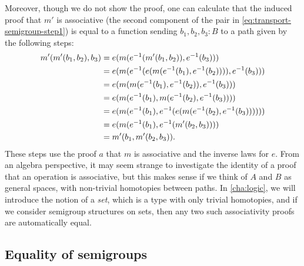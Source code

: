 Moreover, though we do not show the proof, one can calculate that the
induced proof that $m'$ is associative (the second component of the pair
in \eqref{eq:transport-semigroup-step1}) is equal to a function sending
$b_1,b_2,b_3 : B$ to a path given by the following steps:
\begin{equation}
  \label{eq:transport-semigroup-assoc}
  \begin{aligned}
    m'(m'(b_1,b_2),b_3)
    &= e(m(\opp{e}(m'(b_1,b_2)),\opp{e}(b_3))) \\
    &= e(m(\opp{e}(e(m(\opp{e}(b_1),\opp{e}(b_2)))),\opp{e}(b_3))) \\
    &= e(m(m(\opp{e}(b_1),\opp{e}(b_2)),\opp{e}(b_3))) \\
    &= e(m(\opp{e}(b_1),m(\opp{e}(b_2),\opp{e}(b_3)))) \\
    &= e(m(\opp{e}(b_1),\opp{e}(e(m(\opp{e}(b_2),\opp{e}(b_3)))))) \\
    &= e(m(\opp{e}(b_1),\opp{e}(m'(b_2,b_3)))) \\
    &= m'(b_1,m'(b_2,b_3)).
\end{aligned}
\end{equation}
These steps use the proof $a$ that $m$ is associative and the inverse
laws for $e$.  From an algebra perspective, it may seem strange to
investigate the identity of a proof that an operation is associative,
but this makes sense if we think of $A$ and $B$ as general spaces, with
non-trivial homotopies between paths.  In \cref{cha:logic}, we will
introduce the notion of a \emph{set}, which is a type with only trivial
homotopies, and if we consider semigroup structures on sets, then any
two such associativity proofs are automatically equal.

\subsection{Equality of semigroups}

